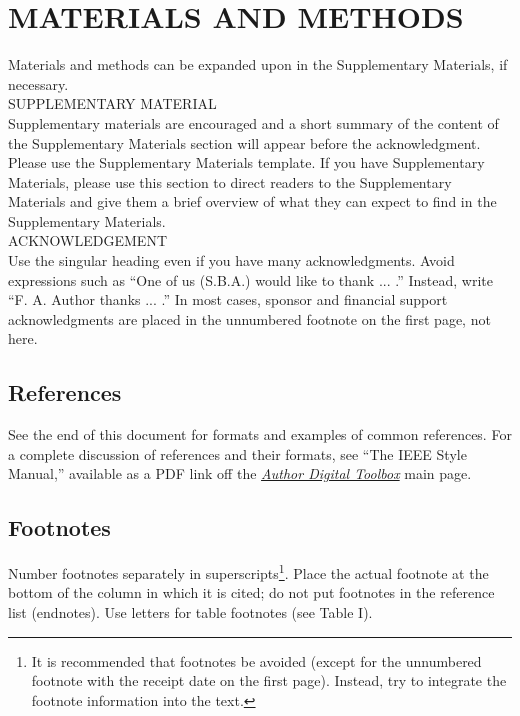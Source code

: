 \section{MATERIALS AND METHODS }	
Materials and methods can be expanded upon in the Supplementary Materials, if necessary.\\

SUPPLEMENTARY MATERIAL\\
Supplementary materials are encouraged and a short summary of the content of the Supplementary Materials section will appear before the acknowledgment. Please use the Supplementary Materials template. If you have Supplementary Materials, please use this section to direct readers to the Supplementary Materials and give them a brief overview of what they can expect to find in the Supplementary Materials. \\


ACKNOWLEDGEMENT\\
Use the singular heading even if you have many acknowledgments. Avoid expressions such as “One of us (S.B.A.) would like to thank ... .” Instead, write “F. A. Author thanks ... .” In most cases, sponsor and financial support acknowledgments are placed in the unnumbered footnote on the first page, not here.


\subsection{References}

See the end of this document for formats and examples of common references. For a complete discussion of references and their formats, see “The IEEE Style Manual,” available as a PDF link off the  \underline{\textit{Author Digital Toolbox}} main page.

\subsection{Footnotes}
Number footnotes separately in superscripts\footnote{It is recommended that footnotes be avoided (except for the unnumbered footnote with the receipt date on the first page). Instead, try to integrate the footnote information into the text.}.  Place the actual footnote at the bottom of the column in which it is cited; do not put footnotes in the reference list (endnotes). Use letters for table footnotes (see Table I). 
